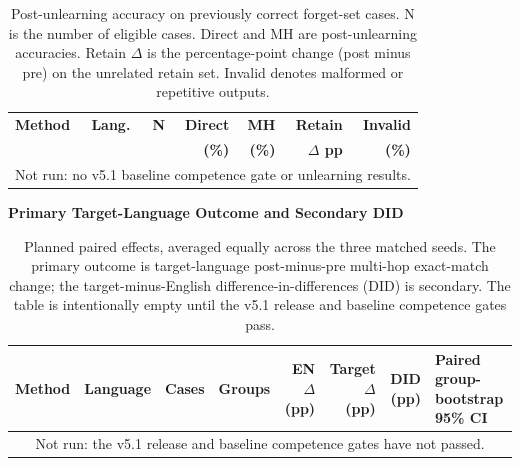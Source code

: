 \documentclass[10pt,a4paper]{article}
\renewcommand{\arraystretch}{1.17}
\begin{document}
\begin{table}[H]
\centering
\scriptsize
\setlength{\tabcolsep}{3pt}
\renewcommand{\arraystretch}{1.15}

\begin{tabularx}{\linewidth}{@{}llrrrrr@{}}
\toprule
\textbf{Method} &
\textbf{Lang.} &
\textbf{N} &
\textbf{Direct} &
\textbf{MH} &
\textbf{Retain} &
\textbf{Invalid} \\
 & & &
\textbf{(\%)} &
\textbf{(\%)} &
\textbf{$\Delta$ pp} &
\textbf{(\%)} \\
\midrule

\multicolumn{7}{c}{Not run: no v5.1 baseline competence gate or unlearning results.} \\

\bottomrule
\end{tabularx}

\caption{
Post-unlearning accuracy on previously correct
forget-set cases. N is the number of eligible cases.
Direct and MH are post-unlearning accuracies.
Retain $\Delta$ is the percentage-point change
(post minus pre) on the unrelated retain set.
Invalid denotes malformed or repetitive outputs.
}
\label{tab:unlearning}
\end{table}

\textbf{Primary Target-Language Outcome and Secondary DID}

\begin{table}[H]
\centering
\scriptsize
\setlength{\tabcolsep}{4pt}
\renewcommand{\arraystretch}{1.15}

\begin{tabularx}{\linewidth}{@{}llrrrrrX@{}}
\toprule
\textbf{Method} &
\textbf{Language} &
\textbf{Cases} &
\textbf{Groups} &
\textbf{EN $\Delta$ (pp)} &
\textbf{Target $\Delta$ (pp)} &
\textbf{DID (pp)} &
\textbf{Paired group-bootstrap 95\% CI} \\
\midrule
\multicolumn{8}{c}{Not run: the v5.1 release and baseline competence gates have not passed.} \\
\bottomrule
\end{tabularx}

\caption{Planned paired effects, averaged equally across the three matched seeds. The primary outcome is target-language post-minus-pre multi-hop exact-match change; the target-minus-English difference-in-differences (DID) is secondary. The table is intentionally empty until the v5.1 release and baseline competence gates pass.}
\label{tab:primary_did}
\end{table}
\end{document}
